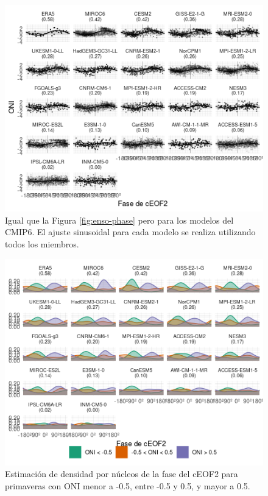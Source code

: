 \documentclass[12pt,oneside]{reedthesis}
\begin{document}
\begin{figure}
\includegraphics{figures/50-cmip6/enso-phase-cmip-1} \caption{Igual que la Figura \ref{fig:enso-phase} pero para los modelos del CMIP6. El ajuste sinusoidal para cada modelo se realiza utilizando todos los miembros.}\label{fig:enso-phase-cmip}
\end{figure}



\begin{figure}
\includegraphics{figures/50-cmip6/arg-enso-density-1} \caption{Estimación de densidad por núcleos de la fase del cEOF2 para primaveras con ONI menor a -0.5, entre -0.5 y 0.5, y mayor a 0.5.}\label{fig:arg-enso-density}
\end{figure}
\end{document}
